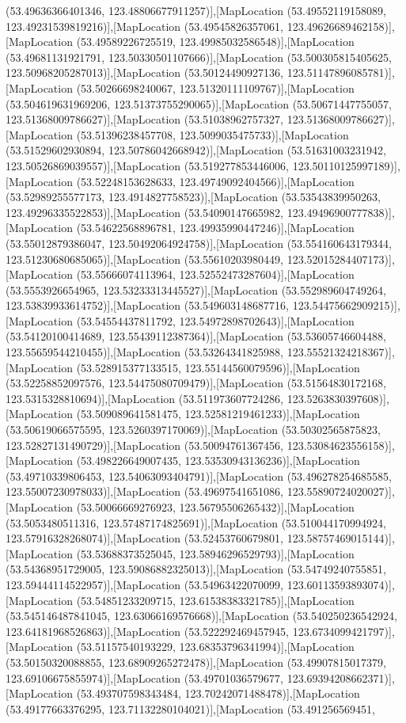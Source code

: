 (53.49636366401346, 123.48806677911257)],[MapLocation (53.49552119158089, 123.49231539819216)],[MapLocation (53.49545826357061, 123.49626689462158)],[MapLocation (53.49589226725519, 123.49985032586548)],[MapLocation (53.49681131921791, 123.50330501107666)],[MapLocation (53.500305815405625, 123.50968205287013)],[MapLocation (53.50124490927136, 123.51147896085781)],[MapLocation (53.50266698240067, 123.51320111109767)],[MapLocation (53.504619631969206, 123.51373755290065)],[MapLocation (53.50671447755057, 123.51368009786627)],[MapLocation (53.51038962757327, 123.51368009786627)],[MapLocation (53.51396238457708, 123.5099035475733)],[MapLocation (53.51529602930894, 123.50786042668942)],[MapLocation (53.51631003231942, 123.50526869039557)],[MapLocation (53.519277853446006, 123.50110125997189)],[MapLocation (53.52248153628633, 123.49749092404566)],[MapLocation (53.52989255577173, 123.4914827758523)],[MapLocation (53.53543839950263, 123.49296335522853)],[MapLocation (53.54090147665982, 123.49496900777838)],[MapLocation (53.54622568896781, 123.49935990447246)],[MapLocation (53.55012879386047, 123.50492064924758)],[MapLocation (53.554160643179344, 123.51230680685065)],[MapLocation (53.55610203980449, 123.52015284407173)],[MapLocation (53.55666074113964, 123.52552473287604)],[MapLocation (53.5553926654965, 123.53233313445527)],[MapLocation (53.552989604749264, 123.53839933614752)],[MapLocation (53.549603148687716, 123.54475662909215)],[MapLocation (53.54554437811792, 123.54972898702643)],[MapLocation (53.54120100414689, 123.55439112387364)],[MapLocation (53.53605746604488, 123.55659544210455)],[MapLocation (53.53264341825988, 123.55521324218367)],[MapLocation (53.528915377133515, 123.55144560079596)],[MapLocation (53.52258852097576, 123.54475080709479)],[MapLocation (53.51564830172168, 123.5315328810694)],[MapLocation (53.511973607724286, 123.5263830397608)],[MapLocation (53.509089641581475, 123.52581219461233)],[MapLocation (53.50619066575595, 123.5260397170069)],[MapLocation (53.50302565875823, 123.52827131490729)],[MapLocation (53.50094761367456, 123.53084623556158)],[MapLocation (53.498226649007435, 123.53530943136236)],[MapLocation (53.49710339806453, 123.54063093404791)],[MapLocation (53.496278254685585, 123.55007230978033)],[MapLocation (53.49697541651086, 123.55890724020027)],[MapLocation (53.50066669276923, 123.56795506265432)],[MapLocation (53.5053480511316, 123.57487174825691)],[MapLocation (53.510044170994924, 123.57916328268074)],[MapLocation (53.52453760679801, 123.58757469015144)],[MapLocation (53.53688373525045, 123.58946296529793)],[MapLocation (53.54368951729005, 123.59086882325013)],[MapLocation (53.54749240755851, 123.59444114522957)],[MapLocation (53.54963422070099, 123.60113593893074)],[MapLocation (53.54851233209715, 123.61538383321785)],[MapLocation (53.545146487841045, 123.63066169576668)],[MapLocation (53.540250236542924, 123.64181968526863)],[MapLocation (53.522292469457945, 123.6734099421797)],[MapLocation (53.51157540193229, 123.68353796341994)],[MapLocation (53.50150320088855, 123.68909265272478)],[MapLocation (53.49907815017379, 123.69106675855974)],[MapLocation (53.49701036579677, 123.69394208662371)],[MapLocation (53.493707598343484, 123.70242071488478)],[MapLocation (53.49177663376295, 123.71132280104021)],[MapLocation (53.491256569451, 